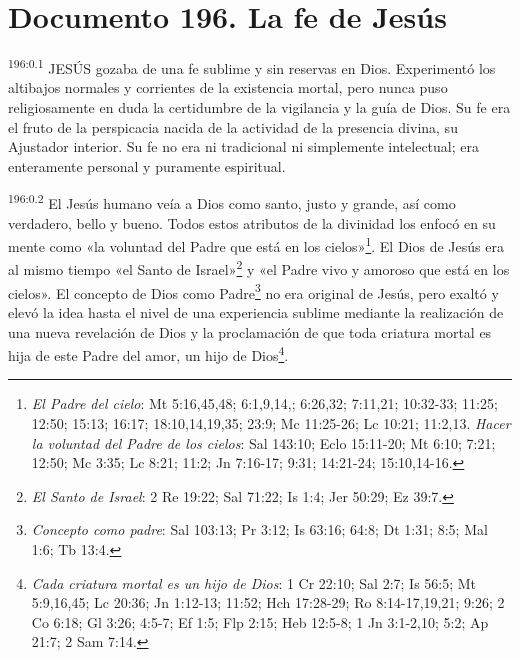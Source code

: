 \chapter{Documento 196. La fe de Jesús}
\par 
\textsuperscript{196:0.1} JESÚS gozaba de una fe sublime y sin reservas en Dios. Experimentó los altibajos normales y corrientes de la existencia mortal, pero nunca puso religiosamente en duda la certidumbre de la vigilancia y la guía de Dios. Su fe era el fruto de la perspicacia nacida de la actividad de la presencia divina, su Ajustador interior. Su fe no era ni tradicional ni simplemente intelectual; era enteramente personal y puramente espiritual.

\par 
\textsuperscript{196:0.2} El Jesús humano veía a Dios como santo, justo y grande, así como verdadero, bello y bueno. Todos estos atributos de la divinidad los enfocó en su mente como «la voluntad del Padre que está en los cielos»\footnote{\textit{El Padre del cielo}: Mt 5:16,45,48; 6:1,9,14,; 6:26,32; 7:11,21; 10:32-33; 11:25; 12:50; 15:13; 16:17; 18:10,14,19,35; 23:9; Mc 11:25-26; Lc 10:21; 11:2,13. \textit{Hacer la voluntad del Padre de los cielos}: Sal 143:10; Eclo 15:11-20; Mt 6:10; 7:21; 12:50; Mc 3:35; Lc 8:21; 11:2; Jn 7:16-17; 9:31; 14:21-24; 15:10,14-16.}. El Dios de Jesús era al mismo tiempo «el Santo de Israel»\footnote{\textit{El Santo de Israel}: 2 Re 19:22; Sal 71:22; Is 1:4; Jer 50:29; Ez 39:7.} y «el Padre vivo y amoroso que está en los cielos». El concepto de Dios como Padre\footnote{\textit{Concepto como padre}: Sal 103:13; Pr 3:12; Is 63:16; 64:8; Dt 1:31; 8:5; Mal 1:6; Tb 13:4.} no era original de Jesús, pero exaltó y elevó la idea hasta el nivel de una experiencia sublime mediante la realización de una nueva revelación de Dios y la proclamación de que toda criatura mortal es hija de este Padre del amor, un hijo de Dios\footnote{\textit{Cada criatura mortal es un hijo de Dios}: 1 Cr 22:10; Sal 2:7; Is 56:5; Mt 5:9,16,45; Lc 20:36; Jn 1:12-13; 11:52; Hch 17:28-29; Ro 8:14-17,19,21; 9:26; 2 Co 6:18; Gl 3:26; 4:5-7; Ef 1:5; Flp 2:15; Heb 12:5-8; 1 Jn 3:1-2,10; 5:2; Ap 21:7; 2 Sam 7:14.}.

